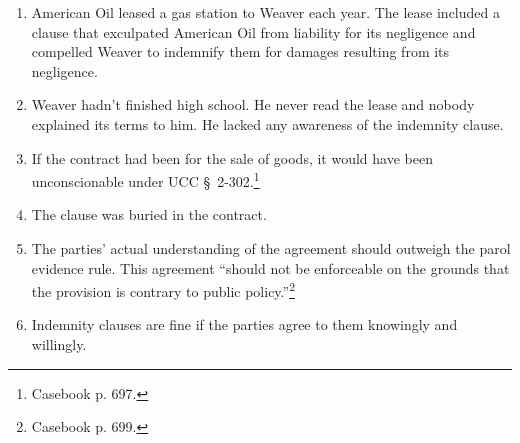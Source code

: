 \begin{enumerate}
    \item American Oil leased a gas station to Weaver each year. The lease 
    included a clause that exculpated American Oil from liability for its 
    negligence and compelled Weaver to indemnify them for damages resulting 
    from its negligence.
    \item Weaver hadn't finished high school. He never read the lease and 
    nobody explained its terms to him. He lacked any awareness of the 
    indemnity clause.
    \item If the contract had been for the sale of goods, it would have been 
    unconscionable under UCC \S\ 2-302.\footnote{Casebook p. 697.}
    \item The clause was buried in the contract.
    \item The parties' actual understanding of the agreement should outweigh 
    the parol evidence rule. This agreement ``should not be enforceable on the 
    grounds that the provision is contrary to public 
    policy.''\footnote{Casebook p. 699.}
    \item Indemnity clauses are fine if the parties agree to them knowingly 
    and willingly.
\end{enumerate}

